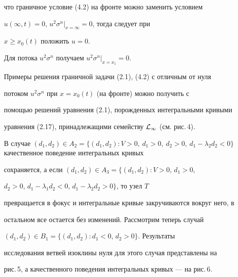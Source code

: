 что граничное условие (4.2) на фронте можно заменить условием 


$u(\infty,t)=0$, $u^2\sigma^n\big|_{x=\infty}=0$, тогда следует при 


$x\ge x_0(t)$ положить $u=0$. 


 


\begin{note} 


Для потока $u^2\sigma^n$ получаем $u^2\sigma^n\big|_{x=x_1}=0$. 


\end{note} 


 


\begin{note} 


Примеры решения граничной задачи (2.1), (4.2) с отличным от нуля 


потоком $u^2\sigma^n$ при $x=x_0(t)$ (на фронте) можно получить с 


помощью решений уравнения (2.1), порожденных интегральными кривыми 


уравнения (2.17), принадлежащими семейству $\cal L_1$ (см. рис.\,4). 


\end{note} 


 


В случае $(d_1,d_2)\in A_2=\{(d_1,d_2):V>0,\ d_1>0,\ d_2>0,\ 


d_1-\lambda_2d_2<0\}$ качественное поведение интегральных кривых 


сохраняется, а если $(d_1,d_2)\in A_3=\{(d_1,d_2):V>0$, $d_1>0$, 


$d_2>0$, $d_1-\lambda_1d_2<0$, $d_1-\lambda_2d_2>0\}$, то узел $T$ 


превращается в фокус и интегральные кривые закручиваются вокруг него, в 


остальном все остается без изменений. Рассмотрим теперь случай 


$(d_1,d_2)\in B_1=\{(d_1,d_2):d_1<0$, $d_2>0\}$. Результаты 


исследования ветвей изоклины нуля для этого случая представлены на 


рис.\,5, а качественного поведения интегральных кривых --- на рис.\,6. 


 




